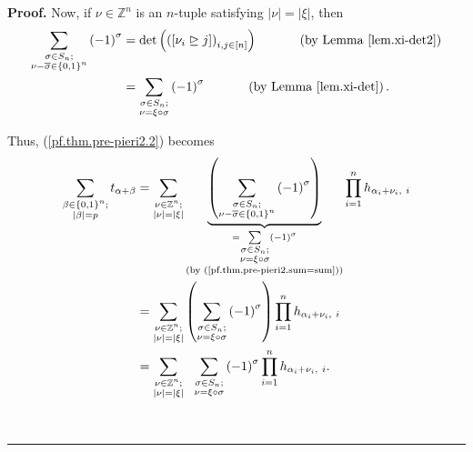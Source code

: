 \documentclass[numbers=enddot,12pt,final,onecolumn,notitlepage,english]{scrartcl}%
\theoremstyle{definition}
\newenvironment{proof}[1][Proof]{\noindent\textbf{#1.} }{\ \rule{0.5em}{0.5em}}
\let\sumnonlimits\sum
\let\prodnonlimits\prod
\renewcommand{\sum}{\sumnonlimits\limits}
\renewcommand{\prod}{\prodnonlimits\limits}
\newenvironment{verlong}{}{}
\begin{document}
\begin{verlong}
\begin{proof}
Now, if $\nu\in\mathbb{Z}^{n}$ is an $n$-tuple satisfying $\left\vert
\nu\right\vert =\left\vert \xi\right\vert $, then%
\begin{align}
\sum_{\substack{\sigma\in S_{n};\\\nu-\overline{\sigma}\in\left\{
0,1\right\}  ^{n}}}\left(  -1\right)  ^{\sigma}  &  =\det\left(  \left(
\left[  \nu_{i}\trianglerighteq j\right]  \right)  _{i,j\in\left[  n\right]
}\right)  \ \ \ \ \ \ \ \ \ \ \left(  \text{by Lemma \ref{lem.xi-det2}}\right)
\nonumber\\
&  =\sum_{\substack{\sigma\in S_{n};\\\nu=\xi\circ\sigma}}\left(  -1\right)
^{\sigma}\ \ \ \ \ \ \ \ \ \ \left(  \text{by Lemma \ref{lem.xi-det}}\right)
. \label{pf.thm.pre-pieri2.sum=sum}%
\end{align}


Thus, (\ref{pf.thm.pre-pieri2.2}) becomes%
\begin{align}
\sum_{\substack{\beta\in\left\{  0,1\right\}  ^{n};\\\left\vert \beta
\right\vert =p}}t_{\alpha+\beta}  &  =\sum_{\substack{\nu\in\mathbb{Z}%
^{n};\\\left\vert \nu\right\vert =\left\vert \xi\right\vert }%
}\underbrace{\left(  \sum_{\substack{\sigma\in S_{n};\\\nu-\overline{\sigma
}\in\left\{  0,1\right\}  ^{n}}}\left(  -1\right)  ^{\sigma}\right)
}_{\substack{=\sum_{\substack{\sigma\in S_{n};\\\nu=\xi\circ\sigma}}\left(
-1\right)  ^{\sigma}\\\text{(by (\ref{pf.thm.pre-pieri2.sum=sum}))}}%
}\prod_{i=1}^{n}h_{\alpha_{i}+\nu_{i},\ i}\nonumber\\
&  =\sum_{\substack{\nu\in\mathbb{Z}^{n};\\\left\vert \nu\right\vert
=\left\vert \xi\right\vert }}\left(  \sum_{\substack{\sigma\in S_{n};\\\nu
=\xi\circ\sigma}}\left(  -1\right)  ^{\sigma}\right)  \prod_{i=1}^{n}%
h_{\alpha_{i}+\nu_{i},\ i}\nonumber\\
&  =\sum_{\substack{\nu\in\mathbb{Z}^{n};\\\left\vert \nu\right\vert
=\left\vert \xi\right\vert }}\ \ \sum_{\substack{\sigma\in S_{n};\\\nu
=\xi\circ\sigma}}\left(  -1\right)  ^{\sigma}\prod_{i=1}^{n}h_{\alpha_{i}%
+\nu_{i},\ i}. \label{pf.thm.pre-pieri2.2b}%
\end{align}



\end{proof}
\end{verlong}
\end{document}
